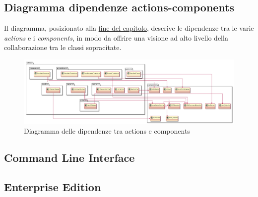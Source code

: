 \subsection{Diagramma dipendenze actions-components}
Il diagramma, posizionato alla \hyperref[img-actioncomponents]{fine del capitolo}, descrive le dipendenze tra le varie \textit{actions} e i \textit{components}, in modo da offrire una visione ad alto livello della collaborazione tra le classi sopracitate.
\begin{figure}
	\centering
	\includegraphics[width=\textwidth]{immagini/actionscomponents}
	\caption{Diagramma delle dipendenze tra actions e components}
	\label{img-actioncomponents}
\end{figure}
\subsection{Command Line Interface}
\subsection{Enterprise Edition}